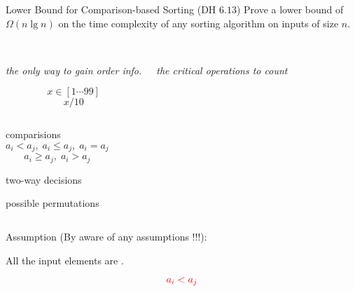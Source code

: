 \begin{frame}{}
  \begin{exampleblock}{Lower Bound for Comparison-based Sorting (DH $6.13$)}
    Prove a lower bound of $\Omega(n \lg n)$
    on the time complexity of any  sorting 
    algorithm on inputs of size $n$.
  \end{exampleblock}

  \vspace{0.30cm}
  \begin{columns}
    \pause
      \begin{center}
	 \\[6pt]
	{\it the only way to gain order info.}

	\pause
	\[
	  x \in [1 \cdots 99]
	\]
	\[
	  x / 10
	\]
      \end{center}
    \pause
      \begin{center}
	 \\[6pt]
	{\it the critical operations to count}
      \end{center}

      \pause
  \end{columns}
\end{frame}

\begin{frame}{}
  \begin{center}
    {\Large {}} 

    \pause
    \vspace{0.80cm}
    \begin{columns}
	\begin{description}[Leaves:]
	  \item[Nodes:] comparisions 
	    \[
	      a_i < a_j, \; a_i \le a_j, \; a_i = a_j 
	    \]
	    \[
	      a_i \ge a_j, \; a_i > a_j
	    \]
	  \item[Edges:] two-way decisions
	  \item[Leaves:] possible permutations
	\end{description}
    \end{columns}

    \pause
    \vspace{0.60cm}
    \begin{alertblock}{Assumption (By aware of any assumptions !!!):}
      \centerline{All the input elements are .}

      \pause
      \[
	\textcolor{red}{a_i < a_j}
      \]
    \end{alertblock}
  \end{center}
\end{frame}

